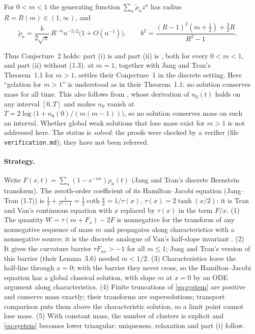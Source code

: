 \documentclass[11pt,a4paper]{report}
\newcommand{\rtil}{\tilde\rho}
\begin{document}
\begin{theorem}\label{thm:asymptotics}
For \(0<m<1\) the generating function \(\sum_n\rtil_nz^n\) has radius \(R=R(m)\in(1,\infty)\), and
\[
\rtil_n=\frac{b}{2\sqrt\pi}\,R^{-n}n^{-5/2}\bigl(1+O(n^{-1})\bigr),\qquad
b^2=\frac{(R-1)^2(m+\frac12)+\frac32R}{R^2-1}.
\]
\end{theorem}

Thus Conjecture~2 holds: part (i) is  and part (ii) is , both
for every \(0<m<1\), and part (ii) without (1.3).  at \(m=1\), together with Jang and
Tran's Theorem~1.1 for \(m>1\), settles their Conjecture~1 in the discrete setting. Here ``gelation for
\(m>1\)'' is understood as in their Theorem~1.1: no solution conserves mass for all time. This also follows
from , whose derivation of \(n_0(t)\) holds on any interval \([0,T]\) and makes \(n_0\)
vanish at \(T=2\log\bigl(1+n_0(0)/(m(m-1))\bigr)\), so no solution conserves mass on such an interval.
Whether global weak solutions that lose mass exist for \(m>1\) is not addressed here.
The status is \emph{solved}: the proofs were checked by a verifier (file
\texttt{verification.md}); they have not been refereed.

\paragraph{Strategy.}
Write \(F(x,t)=\sum_n(1-e^{-nx})\rho_n(t)\) (Jang and Tran's discrete Bernstein transform). The zeroth-order
coefficient of its Hamilton--Jacobi equation (Jang--Tran (1.7)) is
\(\frac12+\frac1{e^x-1}=\frac12\coth\frac x2=1/\tau(x)\), \(\tau(x)=2\tanh(x/2)\): it is Tran and Van's
continuous equation with \(x\) replaced by \(\tau(x)\) in the term \(F/x\).
(1) The quantity \(W=\tau(m+F_x)-2F\) is nonnegative for the transform of any nonnegative sequence of mass
\(m\) and propagates along characteristics with a nonnegative source; it is the discrete analogue of Van's
half-slope invariant \autocite{Van2026}. (2) It gives the curvature barrier \(\tau F_{xx}>-1\) for all
\(m\le1\); Jang and Tran's version of this barrier (their Lemma~3.6) needed \(m<1/2\). (3) Characteristics
leave the half-line through \(x=0\); with the barrier they never cross, so the Hamilton--Jacobi equation has a
global classical solution, with slope \(m\) at \(x=0\) by an ODE argument along characteristics. (4) Finite
truncations of \eqref{eq:system} are positive and conserve mass exactly; their transforms are
supersolutions; transport comparison puts them above the characteristic solution, so a limit point cannot
lose mass. (5) With constant mass, the number of clusters is explicit and \eqref{eq:system} becomes lower
triangular: uniqueness, relaxation and part (i) follow.
\end{document}
